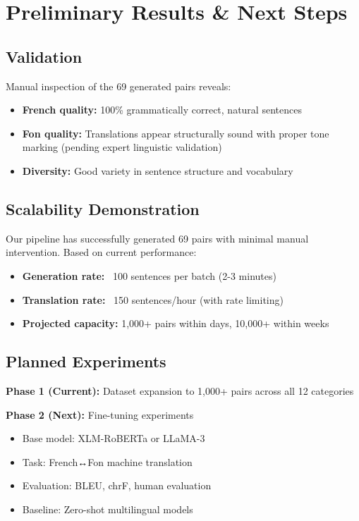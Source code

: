 \documentclass[10pt,twocolumn]{article}
\begin{document}
\section{Preliminary Results \& Next Steps}

\subsection{Validation}

Manual inspection of the 69 generated pairs reveals:
\begin{itemize}[leftmargin=*,noitemsep,topsep=0pt]
    \item \textbf{French quality:} 100\% grammatically correct, natural sentences
    \item \textbf{Fon quality:} Translations appear structurally sound with proper tone marking (pending expert linguistic validation)
    \item \textbf{Diversity:} Good variety in sentence structure and vocabulary
\end{itemize}

\subsection{Scalability Demonstration}

Our pipeline has successfully generated 69 pairs with minimal manual intervention. Based on current performance:
\begin{itemize}[leftmargin=*,noitemsep,topsep=0pt]
    \item \textbf{Generation rate:} ~100 sentences per batch (2-3 minutes)
    \item \textbf{Translation rate:} ~150 sentences/hour (with rate limiting)
    \item \textbf{Projected capacity:} 1,000+ pairs within days, 10,000+ within weeks
\end{itemize}

\subsection{Planned Experiments}

\textbf{Phase 1 (Current):} Dataset expansion to 1,000+ pairs across all 12 categories

\textbf{Phase 2 (Next):} Fine-tuning experiments
\begin{itemize}[leftmargin=*,noitemsep,topsep=0pt]
    \item Base model: XLM-RoBERTa or LLaMA-3
    \item Task: French↔Fon machine translation
    \item Evaluation: BLEU, chrF, human evaluation
    \item Baseline: Zero-shot multilingual models
\end{itemize}
\end{document}
